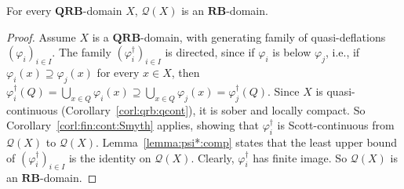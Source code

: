\documentclass{LMCS}
\newcommand\Smyth{\mathcal Q}
\newcommand\QRB{\mathbf{QRB}}
\newcommand\RB{\mathbf{RB}}
\begin{document}
\begin{prop}
  \label{prop:qrb:Smyth}
  For every $\QRB$-domain $X$, $\Smyth (X)$ is an $\RB$-domain.
\end{prop}
\begin{proof}
  Assume $X$ is a $\QRB$-domain, with generating family of
  quasi-deflations ${(\varphi_i)}_{i \in I}$.  The family
  ${(\varphi_i^\dagger)}_{i \in I}$ is directed, since if $\varphi_i$
  is below $\varphi_j$, i.e., if $\varphi_i (x) \supseteq \varphi_j
  (x)$ for every $x \in X$, then $\varphi_i^\dagger (Q) = \bigcup_{x
    \in Q} \varphi_i (x) \supseteq \bigcup_{x \in Q} \varphi_j (x) =
  \varphi_j^\dagger (Q)$.  Since $X$ is quasi-continuous
  (Corollary~\ref{corl:qrb:qcont}), it is sober and locally compact.
  So Corollary~\ref{corl:fin:cont:Smyth} applies, showing that
  $\varphi_i^\dagger$ is Scott-continuous from $\Smyth (X)$ to $\Smyth
  (X)$.  Lemma~\ref{lemma:psi*:comp} states that the least upper bound
  of ${(\varphi_i^\dagger)}_{i \in I}$ is the identity on $\Smyth
  (X)$.  Clearly, $\varphi_i^\dagger$ has finite image.  So $\Smyth
  (X)$ is an $\RB$-domain.
\end{proof}
\end{document}
